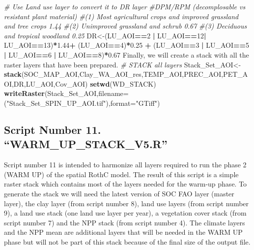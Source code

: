 \documentclass[
  10pt,
  b5paper,
]{book}
\newenvironment{Shaded}{\begin{snugshade}}{\end{snugshade}}
\newcommand{\CommentTok}[1]{\textcolor[rgb]{0.56,0.35,0.01}{\textit{#1}}}
\newcommand{\DataTypeTok}[1]{\textcolor[rgb]{0.13,0.29,0.53}{#1}}
\newcommand{\DecValTok}[1]{\textcolor[rgb]{0.00,0.00,0.81}{#1}}
\newcommand{\FloatTok}[1]{\textcolor[rgb]{0.00,0.00,0.81}{#1}}
\newcommand{\KeywordTok}[1]{\textcolor[rgb]{0.13,0.29,0.53}{\textbf{#1}}}
\newcommand{\NormalTok}[1]{#1}
\newcommand{\OperatorTok}[1]{\textcolor[rgb]{0.81,0.36,0.00}{\textbf{#1}}}
\newcommand{\StringTok}[1]{\textcolor[rgb]{0.31,0.60,0.02}{#1}}
\begin{document}
\begin{Shaded}
\begin{Highlighting}[]
\CommentTok{# Use Land use layer to convert it to DR layer }
\CommentTok{#DPM/RPM (decomplosable vs resistant plant material)}
\CommentTok{#(1) Most agricultural crops and improved grassland and tree crops 1.44 }
\CommentTok{#(2) Unimproved grassland and schrub 0.67}
\CommentTok{#(3) Deciduous and tropical woodland 0.25    }
\NormalTok{DR<-(LU_AOI}\OperatorTok{==}\DecValTok{2} \OperatorTok{|}\StringTok{ }\NormalTok{LU_AOI}\OperatorTok{==}\DecValTok{12}\OperatorTok{|}\StringTok{ }\NormalTok{LU_AOI}\OperatorTok{==}\DecValTok{13}\NormalTok{)}\OperatorTok{*}\FloatTok{1.44}\OperatorTok{+}\StringTok{ }\NormalTok{(LU_AOI}\OperatorTok{==}\DecValTok{4}\NormalTok{)}\OperatorTok{*}\FloatTok{0.25} \OperatorTok{+}\StringTok{ }\NormalTok{(LU_AOI}\OperatorTok{==}\DecValTok{3} \OperatorTok{|}\StringTok{ }\NormalTok{LU_AOI}\OperatorTok{==}\DecValTok{5} \OperatorTok{|}\StringTok{ }\NormalTok{LU_AOI}\OperatorTok{==}\DecValTok{6} \OperatorTok{|}\StringTok{ }\NormalTok{LU_AOI}\OperatorTok{==}\DecValTok{8}\NormalTok{)}\OperatorTok{*}\FloatTok{0.67}
\NormalTok{ Finally, we will create a stack with all the raster layers that have been prepared.}
 \CommentTok{# STACK all layers}
\NormalTok{Stack_Set_AOI<-}\KeywordTok{stack}\NormalTok{(SOC_MAP_AOI,Clay_WA_AOI_res,TEMP_AOI,PREC_AOI,PET_AOI,DR,LU_AOI,Cov_AOI)}
\KeywordTok{setwd}\NormalTok{(WD_STACK)}
\KeywordTok{writeRaster}\NormalTok{(Stack_Set_AOI,}\DataTypeTok{filename=}\NormalTok{(}\StringTok{"Stack_Set_SPIN_UP_AOI.tif"}\NormalTok{),}\DataTypeTok{format=}\StringTok{"GTiff"}\NormalTok{)}
\end{Highlighting}
\end{Shaded}

\hypertarget{script-number-11.-warm_up_stack_v5.r}{%
\subsection{Script Number 11. ``WARM\_UP\_STACK\_V5.R''}\label{script-number-11.-warm_up_stack_v5.r}}

Script number 11 is intended to harmonize all layers required to run the phase 2 (WARM UP) of the spatial RothC model. The result of this script is a simple raster stack which contains most of the layers needed for the warm-up phase. To generate the stack we will need the latest version of SOC FAO layer (master layer), the clay layer (from script number 8), land use layers (from script number 9), a land use stack (one land use layer per year), a vegetation cover stack (from script number 7) and the NPP stack (from script number 4). The climate layers and the NPP mean are additional layers that will be needed in the WARM UP phase but will not be part of this stack because of the final size of the output file.
\end{document}
